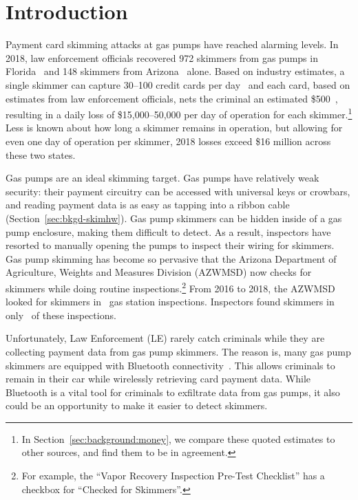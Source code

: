 \section{Introduction}
\label{sec:intro}


Payment card skimming attacks at gas pumps have reached alarming levels.
%
In 2018, law enforcement officials recovered 972 skimmers from gas pumps in Florida~\cite{florida-2018} and 148 skimmers from Arizona~\cite{arizona-2018} alone.
Based on industry estimates, a single skimmer can capture 30--100 credit cards per day~\cite{rippleshot} and each card, based on estimates from law enforcement officials, nets the criminal an estimated \$500~\cite{ussc-guidelines}, resulting in a daily loss of \$15,000--50,000 per day of operation for each skimmer.\footnote{In Section~\ref{sec:background:money}, we compare these quoted estimates to other sources, and find them to be in agreement.} Less is known about how long a skimmer remains in operation, but allowing for even one day of operation per skimmer, 2018 losses exceed \$16 million across these two states.

Gas pumps are an ideal skimming target.
%
Gas pumps have relatively weak security: their payment circuitry can be accessed with universal keys or crowbars, and reading payment data is as easy as tapping into a ribbon cable (Section~\ref{sec:bkgd-skimhw}).
% 
Gas pump skimmers can be hidden inside of a gas pump enclosure, making them difficult to detect.
% 
As a result, inspectors have resorted to manually opening the pumps to inspect their wiring for skimmers.
% 
Gas pump skimming has become so pervasive that the Arizona Department of Agriculture, Weights and Measures Division (AZWMSD) now checks for skimmers while doing routine inspections.\footnote{For example,
the ``Vapor Recovery Inspection Pre-Test Checklist'' has a checkbox for ``Checked for Skimmers''.}
%
From 2016 to 2018, the AZWMSD looked for skimmers in \azskiminspect~gas station inspections.
%
Inspectors found skimmers in only \azpercentskimfound~of these inspections.

Unfortunately, Law Enforcement (LE) rarely catch criminals while they are collecting payment data from gas pump skimmers.
%
The reason is, many gas pump skimmers are equipped with Bluetooth connectivity~\cite{krebs-siphoning,krebs-pos,krebs-gang,krebs-mexico}.
%
This allows criminals to remain in their car while wirelessly retrieving card payment data.
%
While Bluetooth is a vital tool for criminals to exfiltrate data from gas
pumps, it also could be an opportunity to make it easier to detect skimmers.

